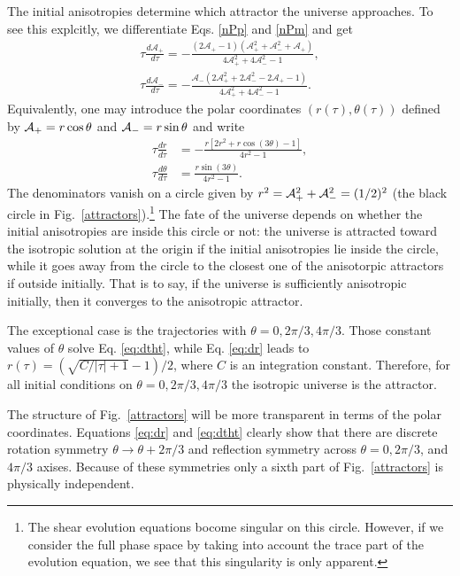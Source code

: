 \documentclass[aps,prd,preprint,superscriptaddress,nofootinbib,tightenlines]{revtex4-1}
\begin{document}
The initial anisotropies determine which attractor the universe approaches.
To see this explcitly, we
differentiate Eqs. \eqref{nPp} and \eqref{nPm} and
get
\begin{eqnarray}
\tau \frac{d \mathcal{A}_+}{d\tau}
=
- \frac{  (2\mathcal{A}_+ - 1)
(\mathcal{A}_+^2+\mathcal{A}_-^2+\mathcal{A}_+)}{4\mathcal{A}_+^2 + 4\mathcal{A}_-^2 - 1 } ,\label{eq:dap}
\\
\tau \frac{d \mathcal{A}_-}{d\tau}
=
- \frac{ \mathcal{A}_- (2\mathcal{A}_+^2 + 2\mathcal{A}_-^2 - 2\mathcal{A}_+ - 1)}{ 4\mathcal{A}_+^2 + 4\mathcal{A}_-^2 - 1 } .\label{eq:dam}
\end{eqnarray}
Equivalently, one may introduce
the polar coordinates $(r(\tau),\theta(\tau))$ defined by ${\cal A_+}=r\cos\theta$
and ${\cal A}_-=r\sin\theta$ and write
\begin{align}
\tau \frac{dr}{d\tau}&=-\frac{r[2r^2+r\cos(3\theta)-1]}{4r^2-1},
\label{eq:dr}
\\
\tau\frac{d\theta}{d\tau}&=\frac{r\sin(3\theta)}{4r^2-1}.\label{eq:dtht}
\end{align}
The denominators vanish on a circle given by
$r^2={\cal A}_+^2+{\cal A}_-^2=(1/2)^2$
(the black circle in Fig.~\ref{attractors}).\footnote{The shear evolution
equations bocome singular on this circle. However,
if we consider the full phase space by
taking into account the trace part of the evolution equation,
we see that this singularity is only apparent.}
The fate of the universe depends on whether the
initial anisotropies are inside this circle or not:
the universe is attracted toward the isotropic solution
at the origin if the initial anisotropies lie inside the circle,
while it goes away from the circle to
the closest one of the anisotorpic attractors
if outside initially.
That is to say, if the universe is sufficiently anisotropic initially,
then it converges to the anisotropic attractor.


The exceptional case is the trajectories with $\theta=0, 2\pi/3, 4\pi/3$.
Those constant values of $\theta$ solve Eq. \eqref{eq:dtht},
while Eq. \eqref{eq:dr} leads to
$r(\tau)=(\sqrt{C/|\tau|+1}-1)/2$, where $C$ is an integration constant.
Therefore, for all initial conditions on $\theta=0, 2\pi/3, 4\pi/3$
the isotropic universe is the attractor.




The structure of Fig.~\ref{attractors} will be more transparent
in terms of the polar coordinates.
Equations \eqref{eq:dr} and \eqref{eq:dtht}
clearly show that there are discrete rotation symmetry $\theta\to \theta + 2\pi/3$
and reflection symmetry across $\theta=0, 2\pi/3$, and $4\pi/3$ axises.
Because of these symmetries only a sixth part of Fig.~\ref{attractors}
is physically independent.
\end{document}
